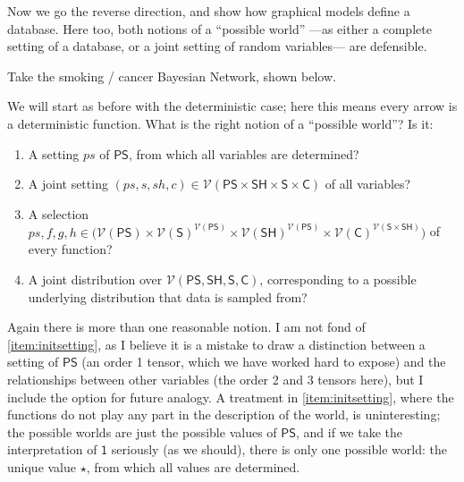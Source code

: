 \documentclass{article}
\newcommand\cmergearr[4]{
		\draw[arr,-] (#1) -- (#4) -- (#2);
		\draw[arr, shorten <=0] (#4) -- (#3);
	}
\newcommand\mergearr[3]{
		\coordinate (center-#1#2#3) at (barycentric cs:#1=1,#2=1,#3=1.2);
		\cmergearr{#1}{#2}{#3}{center-#1#2#3}
	}
\theoremstyle{plain}
\theoremstyle{definition}
\theoremstyle{remark}
\newcommand{\V}{\mathcal V}
\newcommand{\var}[1]{\mathsf{#1}}
\begin{document}
Now we go the reverse direction, and show how graphical models define a database. Here too, both notions of a ``possible world'' ---as either a complete setting of a database, or a joint setting of random variables--- are defensible.
\begin{example}\label{ex:smoking}
    Take the smoking / cancer Bayesian Network, shown below.
    \begin{center}
    \end{center}
    
    We will start as before with the deterministic case; here this means every arrow is a deterministic function. What is the right notion of a ``possible world''? Is it:

    \begin{enumerate}[label=(\arabic*)]
        \item A setting $ps$ of $\var{PS}$, from which all variables are determined? \label{item:initsetting}
        \item A joint setting $(ps, s, sh, c) \in \V(\var{PS \times SH \times S \times C})$ of all variables? \label{item:jointsetting}
        \item A selection $ps,f,g,h \in \Big(\var{\V(PS) \times \V(S)^{\V(PS)}\times \V(SH)^{\V(PS)}\times \V(C)^{\V(S\times SH)}} \Big)$ of every function? \label{item:everyfunction}
        \item A joint distribution over $\V(\var{PS,SH,S,C})$, corresponding to a possible underlying distribution that data is sampled from?
    \end{enumerate}
    
    Again there is more than one reasonable notion. I am not fond of \cref{item:initsetting}, as I believe it is a mistake to draw a distinction between a setting of $\var{PS}$ (an order 1 tensor, which we have worked hard to expose) and the relationships between other variables (the order 2 and 3 tensors here), but I include the option for future analogy. A treatment in \cref{item:initsetting}, where the functions do not play any part in the description of the world, is uninteresting; the possible worlds are just the possible values of $\var{PS}$, and if we take the interpretation of $\var 1$ seriously (as we should), there is only one possible world: the unique value $\star$, from which all values are determined. 
    

\end{example}
\end{document}
